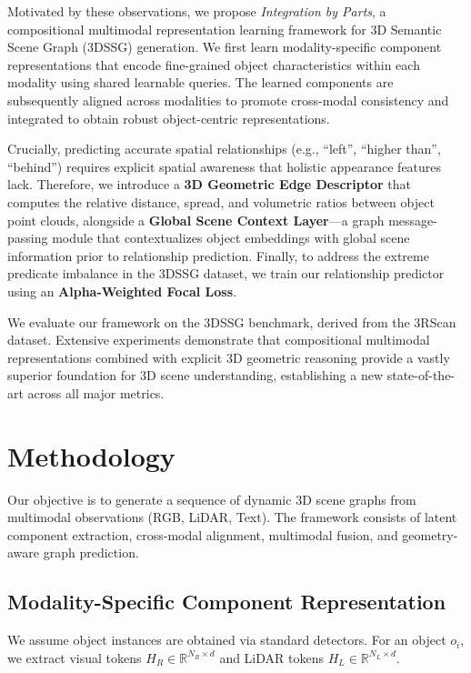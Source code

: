 \documentclass[letterpaper]{article}
\begin{document}
Motivated by these observations, we propose \textit{Integration by Parts}, a compositional multimodal representation learning framework for 3D Semantic Scene Graph (3DSSG) generation. We first learn modality-specific component representations that encode fine-grained object characteristics within each modality using shared learnable queries. The learned components are subsequently aligned across modalities to promote cross-modal consistency and integrated to obtain robust object-centric representations. 

Crucially, predicting accurate spatial relationships (e.g., ``left'', ``higher than'', ``behind'') requires explicit spatial awareness that holistic appearance features lack. Therefore, we introduce a \textbf{3D Geometric Edge Descriptor} that computes the relative distance, spread, and volumetric ratios between object point clouds, alongside a \textbf{Global Scene Context Layer}—a graph message-passing module that contextualizes object embeddings with global scene information prior to relationship prediction. Finally, to address the extreme predicate imbalance in the 3DSSG dataset, we train our relationship predictor using an \textbf{Alpha-Weighted Focal Loss}.

We evaluate our framework on the 3DSSG benchmark, derived from the 3RScan dataset. Extensive experiments demonstrate that compositional multimodal representations combined with explicit 3D geometric reasoning provide a vastly superior foundation for 3D scene understanding, establishing a new state-of-the-art across all major metrics.

\section{Methodology}
Our objective is to generate a sequence of dynamic 3D scene graphs from multimodal observations (RGB, LiDAR, Text). The framework consists of latent component extraction, cross-modal alignment, multimodal fusion, and geometry-aware graph prediction.

\subsection{Modality-Specific Component Representation}
We assume object instances are obtained via standard detectors. For an object $o_i$, we extract visual tokens $H_R \in \mathbb{R}^{N_R \times d}$ and LiDAR tokens $H_L \in \mathbb{R}^{N_L \times d}$. 
\end{document}
